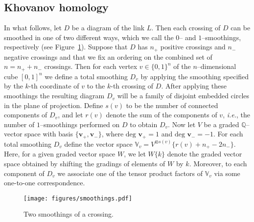 \documentclass[11pt]{article}
\numberwithin{equation}{section}
\begin{document}
\subsection{Khovanov homology}
In what follows, let $D$ be a diagram of the link $L$.
Then each crossing of $D$ can be smoothed in one of two different ways, which we call the $0$-- and $1$--smoothings, respectively (see Figure~\ref{fig:smoothings}).
Suppose that $D$ has $n_+$ positive crossings and $n_-$ negative crossings and that we fix an ordering on the combined set of $n=n_++n_-$ crossings.
Then for each vertex $v \in \{0,1\}^n$ of the $n$--dimensional cube $\left[0,1\right]^n$ we define a total smoothing $D_v$ by applying the smoothing specified by the $k$-th coordinate of $v$ to the $k$-th crossing of $D$.
After applying these smoothings the resulting diagram $D_v$ will be a family of disjoint embedded circles in the plane of projection.
Define $s(v)$ to be the number of connected components of $D_v$, and let $r(v)$ denote the sum of the components of $v$, \textit{i.e.}, the number of $1$--smoothings performed on $D$ to obtain $D_v$.
Now let $V$ be a graded $\mathbb{Q}$--vector space with basis  $\{\mathbf{v}_+,\mathbf{v}_-\}$, where $\text{deg } \mathbf{v}_+ = 1$ and $\text{deg } \mathbf{v}_- = -1$.
For each total smoothing $D_v$ define the vector space $\mathbb{V}_v=V^{\otimes s(v)}\{ r(v)+n_+-2n_-\}$.
Here, for a given graded vector space $W$, we let $W\{k\}$ denote the graded vector space obtained by shifting the gradings of elements of  $W$ by $k$.
Moreover, to each component of $D_v$ we associate one of the tensor product factors of $\mathbb{V}_v$ via some one-to-one correspondence.

\begin{figure}[h!]
 \centering
 \texttt{[image: figures/smoothings.pdf]}
  \caption{\small{Two smoothings of a crossing.}}
  \label{fig:smoothings}
\end{figure}
\end{document}
